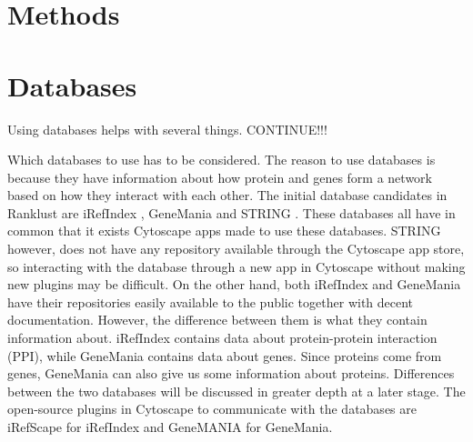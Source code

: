 \documentclass[UKenglish]{ifimaster}
\begin{document}

\chapter{Methods}

\chapter{Databases}
Using databases helps with several things. CONTINUE!!!

Which databases to use has to be considered. The reason to use databases is because they have information about how 
protein and genes form a network based on how they interact with each other. The initial database candidates in Ranklust 
are iRefIndex \cite{iri}, GeneMania \cite{gm} and STRING \cite{str}. These databases all have in common that it exists
Cytoscape apps made to use these databases. STRING however, does not have any repository available through the Cytoscape
app store, so interacting with the database through a new app in Cytoscape without making new plugins may be difficult.
On the other hand, both iRefIndex and GeneMania have their repositories easily available to the public together with
decent documentation. However, the difference between them is what they contain information about. iRefIndex contains
data about protein-protein interaction (PPI), while GeneMania contains data about genes.
Since proteins come from genes, GeneMania can also give us some information about proteins. Differences between the
two databases will be discussed in greater depth at a later stage.
The open-source plugins in Cytoscape to communicate with the databases are iRefScape \cite{iridb} for iRefIndex and 
GeneMANIA \cite{gmdb} for GeneMania.
\end{document}
